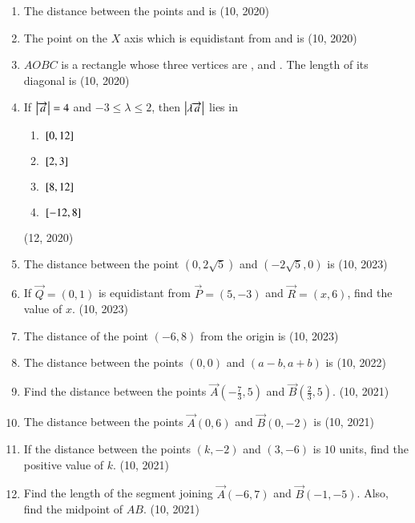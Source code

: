 \begin{enumerate}[label=\thesubsection.\arabic*, ref=\thesubsection.\theenumi]
\item The distance between the points  and  is
\hfill (10, 2020)

\item The point on the $X$ axis which is equidistant from  and  is
\hfill (10, 2020)
%
\item \(AOBC\) is a rectangle whose three vertices are ,  and . The length of its diagonal is
\hfill (10, 2020)
\item If $\begin{vmatrix}\overrightarrow{a}\end{vmatrix}= 4$ and $-3 \leq \lambda \leq 2$, then $\begin{vmatrix}\lambda \overrightarrow a\end{vmatrix}$ lies in
\begin{enumerate}
\item ${}\left[0,12\right]$
\item ${}\left[2,3\right]$
\item ${}\left[8,12\right]$
\item ${}\left[-12,8\right]$
\end{enumerate}
\hfill (12, 2020)
    \item The distance between the point $(0,2\sqrt{5})$ and $(-2\sqrt{5},0)$ is
    \hfill (10, 2023)
    \item If $\vec{Q} = (0,1)$ is equidistant from $\vec{P} = (5,-3)$ and $\vec{R} = (x,6)$, find the value of $x$.
    \hfill (10, 2023)
    \item The distance of the point $(-6,8)$ from the origin is
    \hfill (10, 2023)
    \item The distance between the points $(0,0)$ and $(a-b, a+b)$ is 
    \hfill (10, 2022)
	\item Find the distance between the points $\vec{A}\left(-\frac{7}{3}, 5\right)$ and $\vec{B}\left(\frac{2}{3}, 5\right)$. \hfill (10, 2021)
		\item The distance between the points $\vec{A}(0, 6)$ and $\vec{B}(0, -2)$ is
		\hfill (10, 2021)
		\item If the distance between the points $(k, -2)$ and $(3, -6)$ is $10$ units, find the positive value of $k$. \hfill (10, 2021)
		\item Find the length of the segment joining $\vec{A}(-6, 7)$ and $\vec{B}(-1, -5)$. Also, find the midpoint of $AB$. \hfill (10, 2021)
	

\end{enumerate}
